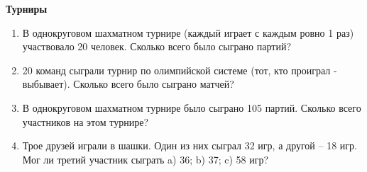 \documentclass{article}
\begin{document}
\begin{center}
	\textbf{Турниры}
\end{center}

\begin{enumerate}[label*=\protect\fbox{\arabic{enumi}}]
	
	\item В однокруговом шахматном турнире (каждый играет с каждым ровно 1 раз) участвовало 20 человек. Сколько всего было сыграно партий?
	
	\item 20 команд сыграли турнир по олимпийской системе (тот, кто проиграл - выбывает). Сколько всего было сыграно матчей?
	
	\item В однокруговом шахматном турнире было сыграно 105 партий. Сколько всего участников на этом турнире?
	
	\item Трое друзей играли в шашки. Один из них сыграл 32 игр, а другой – 18 игр. Мог ли третий участник сыграть a) 36; b) 37; c) 58 игр?
	
\end{enumerate}
\end{document}

